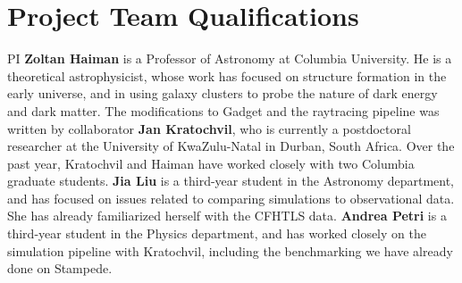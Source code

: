 \documentclass[10pt, preprint]{aastex}
\begin{document}
\section{Project Team Qualifications}

PI {\bf Zoltan Haiman} is a Professor of Astronomy at Columbia
University.  He is a theoretical astrophysicist, whose work has
focused on structure formation in the early universe, and in using
galaxy clusters to probe the nature of dark energy and dark matter.
The modifications to Gadget and the raytracing pipeline was written by
collaborator {\bf Jan Kratochvil}, who is currently a postdoctoral
researcher at the University of KwaZulu-Natal in Durban, South Africa.
Over the past year, Kratochvil and Haiman have worked closely with two
Columbia graduate students.  {\bf Jia Liu} is a third-year student in
the Astronomy department, and has focused on issues related to
comparing simulations to observational data. She has already
familiarized herself with the CFHTLS data.  {\bf Andrea Petri} is a
third-year student in the Physics department, and has worked closely
on the simulation pipeline with Kratochvil, including the benchmarking
we have already done on Stampede.





\end{document}

